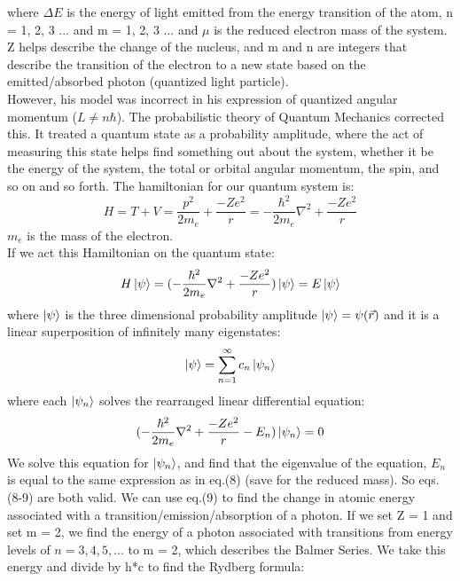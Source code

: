 \documentclass{article}
\begin{document}
        where $\Delta E$ is the energy of light emitted from the energy transition of the atom, n = 1, 2, 3 ... and m = 1, 2, 3 ... and $\mu$ is the reduced electron mass of the system. Z helps describe the change of the nucleus, and m and n are integers that describe the transition of the electron to a new state based on the emitted/absorbed photon (quantized light particle).\\\indent However, his model was incorrect in his expression of quantized angular momentum ($L\neq n \hbar$). The probabilistic theory of Quantum Mechanics corrected this. It treated a quantum state as a probability amplitude, where the act of measuring this state helps find something out about the system, whether it be the energy of the system, the total or orbital angular momentum, the spin, and so on and so forth. The hamiltonian for our quantum system is:
        \begin{equation}
            H = T + V = \frac{p^2}{2m_e} + \frac{-Ze^2}{r} = -\frac{\hbar^2}{2m_e}\nabla^2 + \frac{-Ze^2}{r}
        \end{equation}
        $m_e$ is the mass of the electron.\\
        If we act this Hamiltonian on the quantum state:
        \begin{equation}
            H \ket{\psi} = (-\frac{\hbar^2}{2m_e}\nabla^2 + \frac{-Ze^2}{r}) \ket{\psi} = E\ket{\psi}
        \end{equation}
        where $\ket{\psi}$ is the three dimensional probability amplitude $\ket{\psi} = \psi(\vec{r})$ and it is a linear superposition of infinitely many eigenstates:
        \begin{equation}
            \ket{\psi} = \sum_{n=1}^\infty c_n \ket{\psi_n}
        \end{equation}
        where each $\ket{\psi_n}$ solves the rearranged linear differential equation: 
        \begin{equation}
            (-\frac{\hbar^2}{2m_e}\nabla^2 + \frac{-Ze^2}{r} - E_n) \ket{\psi_n} = 0
        \end{equation}
        We solve this equation for $\ket{\psi_n}$, and find that the eigenvalue of the equation, $E_n$ is equal to the same expression as in eq.(8) (save for the reduced mass). So eqs.(8-9) are both valid. We can use eq.(9) to find the change in atomic energy associated with a transition/emission/absorption of a photon. If we set Z = 1 and set m = 2, we find the energy of a photon associated with transitions from energy levels of $n = 3, 4, 5, ...$ to m = 2, which describes the Balmer Series. We take this energy and divide by h*c to find the Rydberg formula:
\end{document}
